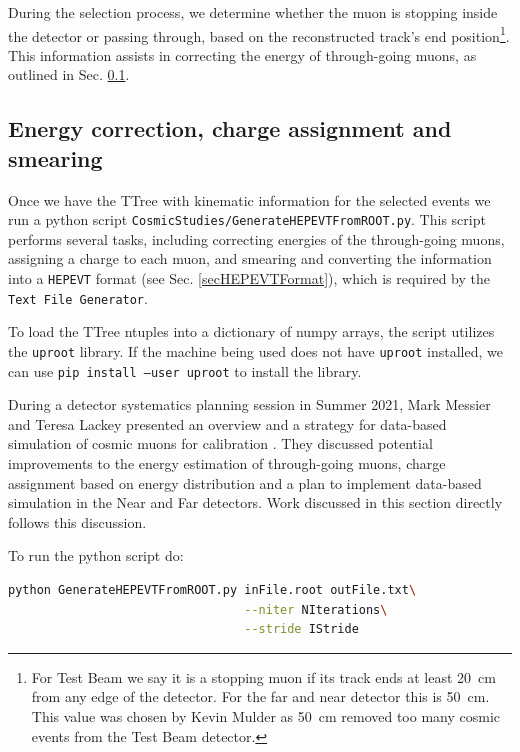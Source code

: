 \documentclass[12pt]{article}
\begin{document}
During the selection process, we determine whether the muon is stopping inside the detector or passing through, based on the reconstructed track's end position\footnote{For Test Beam we say it is a stopping muon if its track ends at least 20~cm from any edge of the detector. For the far and near detector this is 50~cm. This value was chosen by Kevin Mulder \cite{NOVA-doc-39244-v1} as 50~cm removed too many cosmic events from the Test Beam detector.}. This information assists in correcting the energy of through-going muons, as outlined in Sec. \ref{secPython}.

\FloatBarrier
\subsection{Energy correction, charge assignment and smearing}\label{secPython}
Once we have the TTree with kinematic information for the selected events we run a python script \texttt{CosmicStudies/GenerateHEPEVTFromROOT.py}. This script performs several tasks, including correcting energies of the through-going muons, assigning a charge to each muon, and smearing and converting the information into a \texttt{HEPEVT} format (see Sec. \ref{secHEPEVTFormat}), which is required by the \texttt{Text File Generator}.

To load the TTree ntuples into a dictionary of numpy arrays, the script utilizes the \texttt{uproot} library. If the machine being used does not have \texttt{uproot} installed, we can use \texttt{pip install --user uproot} to install the library.

During a detector systematics planning session in Summer 2021, Mark Messier and Teresa Lackey presented an overview and a strategy for data-based simulation of cosmic muons for calibration \cite{NOVA-doc-51327-v3}. They discussed potential improvements to the energy estimation of through-going muons, charge assignment based on energy distribution and a plan to implement data-based simulation in the Near and Far detectors. Work discussed in this section directly follows this discussion.

To run the python script do:
\begin{lstlisting}[frame=single,language=bash]
python GenerateHEPEVTFromROOT.py inFile.root outFile.txt\
                                 --niter NIterations\
                                 --stride IStride
\end{lstlisting}
\end{document}
